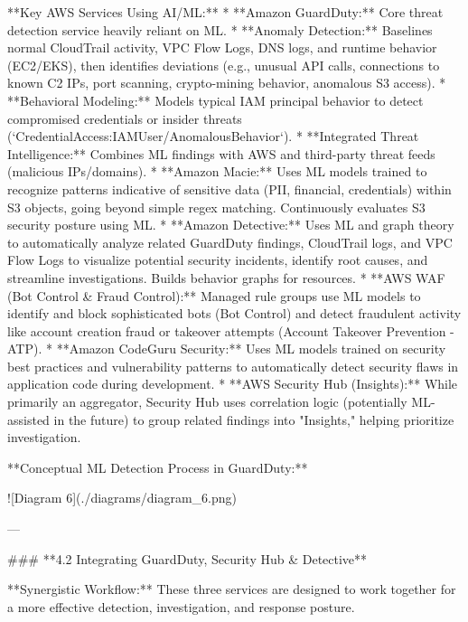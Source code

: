 \documentclass{article}
\begin{document}
**Key AWS Services Using AI/ML:**
* **Amazon GuardDuty:** Core threat detection service heavily reliant on ML.
    * **Anomaly Detection:** Baselines normal CloudTrail activity, VPC Flow Logs, DNS logs, and runtime behavior (EC2/EKS), then identifies deviations (e.g., unusual API calls, connections to known C2 IPs, port scanning, crypto-mining behavior, anomalous S3 access).
    * **Behavioral Modeling:** Models typical IAM principal behavior to detect compromised credentials or insider threats (`CredentialAccess:IAMUser/AnomalousBehavior`).
    * **Integrated Threat Intelligence:** Combines ML findings with AWS and third-party threat feeds (malicious IPs/domains).
* **Amazon Macie:** Uses ML models trained to recognize patterns indicative of sensitive data (PII, financial, credentials) within S3 objects, going beyond simple regex matching. Continuously evaluates S3 security posture using ML.
* **Amazon Detective:** Uses ML and graph theory to automatically analyze related GuardDuty findings, CloudTrail logs, and VPC Flow Logs to visualize potential security incidents, identify root causes, and streamline investigations. Builds behavior graphs for resources.
* **AWS WAF (Bot Control & Fraud Control):** Managed rule groups use ML models to identify and block sophisticated bots (Bot Control) and detect fraudulent activity like account creation fraud or takeover attempts (Account Takeover Prevention - ATP).
* **Amazon CodeGuru Security:** Uses ML models trained on security best practices and vulnerability patterns to automatically detect security flaws in application code during development.
* **AWS Security Hub (Insights):** While primarily an aggregator, Security Hub uses correlation logic (potentially ML-assisted in the future) to group related findings into "Insights," helping prioritize investigation.

**Conceptual ML Detection Process in GuardDuty:**


![Diagram 6](./diagrams/diagram_6.png)



---

### **4.2 Integrating GuardDuty, Security Hub & Detective**

**Synergistic Workflow:** These three services are designed to work together for a more effective detection, investigation, and response posture.
\end{document}
